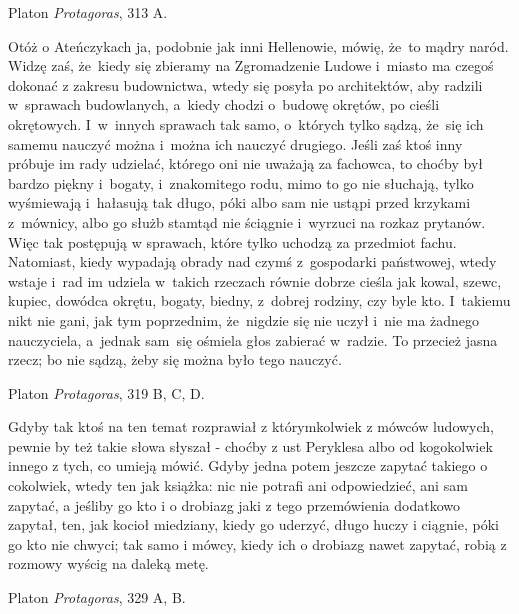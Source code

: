 \documentclass[a4paper,11pt]{article}
\newcommand{\attribA}[1]{#1}
\begin{document}
\attribA{Platon \textit{Protagoras}, 313 A.}

\vspace{\spaceThree}



\noindent
Otóż o Ateńczykach ja, podobnie jak inni Hellenowie, mówię, że~to
mądry naród. Widzę zaś, że~kiedy się zbieramy na Zgromadzenie Ludowe
i~miasto ma czegoś dokonać z zakresu budownictwa, wtedy się posyła po
architektów, aby radzili w~sprawach budowlanych, a~kiedy chodzi
o~budowę okrętów, po cieśli okrętowych. I~w~innych sprawach tak samo,
o~których tylko sądzą, że~się ich samemu nauczyć można i~można ich
nauczyć drugiego. Jeśli zaś ktoś inny próbuje im rady udzielać,
którego oni nie uważają za fachowca, to choćby był bardzo piękny
i~bogaty, i~znakomitego rodu, mimo to go nie słuchają, tylko
wyśmiewają i~hałasują tak długo, póki albo sam nie ustąpi przed
krzykami z~mównicy, albo go służb stamtąd nie ściągnie i~wyrzuci na
rozkaz prytanów. Więc tak postępują w sprawach, które tylko uchodzą za
przedmiot fachu. Natomiast, kiedy wypadają obrady nad czymś
z~gospodarki państwowej, wtedy wstaje i~rad im udziela w~takich
rzeczach równie dobrze cieśla jak kowal, szewc, kupiec, dowódca
okrętu, bogaty, biedny, z~dobrej rodziny, czy byle kto. I~takiemu nikt
nie gani, jak tym poprzednim, że~nigdzie się nie uczył i~nie ma
żadnego nauczyciela, a~jednak sam~się ośmiela głos zabierać w~radzie.
To przecież jasna rzecz; bo nie sądzą, żeby się można było tego
nauczyć.


\attribA{Platon \textit{Protagoras}, 319 B, C, D.}

\vspace{\spaceThree}



\noindent
Gdyby tak ktoś na ten temat rozprawiał z którymkolwiek z mówców
ludowych, pewnie by też takie słowa słyszał - choćby z ust Peryklesa
albo od kogokolwiek innego z tych, co umieją mówić. Gdyby jedna potem
jeszcze zapytać takiego o cokolwiek, wtedy ten jak książka: nic nie
potrafi ani odpowiedzieć, ani sam zapytać, a jeśliby go kto i o
drobiazg jaki z tego przemówienia dodatkowo zapytał, ten, jak kocioł
miedziany, kiedy go uderzyć, długo huczy i ciągnie, póki go kto nie
chwyci; tak samo i mówcy, kiedy ich o drobiazg nawet zapytać, robią z
rozmowy wyścig na daleką metę.


\attribA{Platon \textit{Protagoras}, 329 A, B.}
\end{document}
